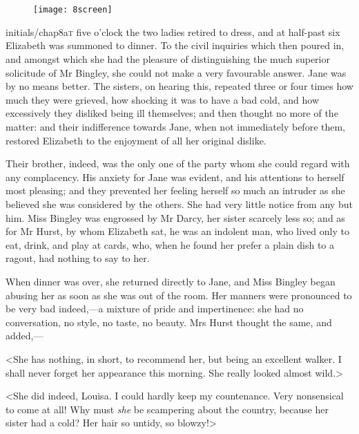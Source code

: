 \chapter[Chapter \thechapter]{}
	
\begin{figure}[t!]
\centering
\texttt{[image: 8screen]}
\end{figure}

\lettrine[lines=6,image=true]{initials/chap8a}{t}  five o'clock the two ladies retired to dress, and at half-past six Elizabeth was summoned to dinner. To the civil inquiries which then poured in, and amongst which she had the pleasure of distinguishing the much superior solicitude of Mr Bingley, she could not make a very favourable answer. Jane was by no means better. The sisters, on hearing this, repeated three or four times how much they were grieved, how shocking it was to have a bad cold, and how excessively they disliked being ill themselves; and then thought no more of the matter: and their indifference towards Jane, when not immediately before them, restored Elizabeth to the enjoyment of all her original dislike.

Their brother, indeed, was the only one of the party whom she could regard with any complacency. His anxiety for Jane was evident, and his attentions to herself most pleasing; and they prevented her feeling herself so much an intruder as she believed she was considered by the others. She had very little notice from any but him. Miss Bingley was engrossed by Mr Darcy, her sister scarcely less so; and as for Mr Hurst, by whom Elizabeth sat, he was an indolent man, who lived only to eat, drink, and play at cards, who, when he found her prefer a plain dish to a ragout, had nothing to say to her.

When dinner was over, she returned directly to Jane, and Miss Bingley began abusing her as soon as she was out of the room. Her manners were pronounced to be very bad indeed,—a mixture of pride and impertinence: she had no conversation, no style, no taste, no beauty. Mrs Hurst thought the same, and added,—

<She has nothing, in short, to recommend her, but being an excellent walker. I shall never forget her appearance this morning. She really looked almost wild.>

<She did indeed, Louisa. I could hardly keep my countenance. Very nonsensical to come at all! Why must \textit{she} be scampering about the country, because her sister had a cold? Her hair so untidy, so blowzy!>

